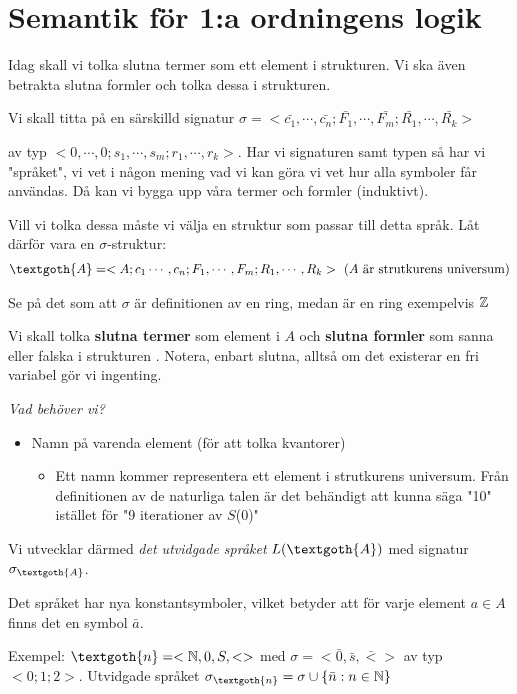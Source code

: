 \section{Semantik för 1:a ordningens logik}
\par\bigskip
\noindent Idag skall vi tolka slutna termer som ett element i strukturen. Vi ska även betrakta slutna formler och tolka dessa i strukturen.
\par\bigskip
\noindent Vi skall titta på en särskilld signatur $\sigma = <\bar{c_1},\cdots, \bar{c_n};\bar{F_1},\cdots, \bar{F_m};\bar{R_1},\cdots,\bar{R_k}>$\par\noindent av typ $<0,\cdots,0;s_1,\cdots,s_m;r_1,\cdots,r_k>$. Har vi signaturen samt typen så har vi "språket", vi vet i någon mening vad vi kan göra vi vet hur alla symboler får användas. Då kan vi bygga upp våra termer och formler (induktivt).
\par\bigskip
\noindent Vill vi tolka dessa måste vi välja en struktur som passar till detta språk. Låt därför  vara en $\sigma$-struktur:
\begin{equation*}
  \begin{gathered}
    \textgoth{A} = <A; c_1\cdots,c_n;F_1,\cdots,F_m;R_1,\cdots,R_k> \text{ ($A$ är strutkurens universum)}
  \end{gathered}
\end{equation*}\par
\noindent Se på det som att $\sigma$ är definitionen av en ring, medan  är en ring exempelvis $\mathbb{Z}$
\par\bigskip
\noindent Vi skall tolka \textbf{slutna termer }som element i $A$ och \textbf{slutna formler} som sanna eller falska i strukturen . Notera, enbart slutna, alltså om det existerar en fri variabel gör vi ingenting.
\par\bigskip
\noindent \textit{Vad behöver vi?}\par
\begin{itemize}
  \item Namn på varenda element (för att tolka kvantorer)
    \begin{itemize}
      \item Ett namn kommer representera ett element i strutkurens universum. Från definitionen av de naturliga talen är det behändigt att kunna säga "10" istället för "9 iterationer av $S$(0)"
    \end{itemize}
\end{itemize}
\par\bigskip
\noindent Vi utvecklar därmed \textit{det utvidgade språket} $L(\textgoth{A})$ med signatur $\sigma_{\textgoth{A}}$.\par
\noindent Det språket har nya konstantsymboler, vilket betyder att för varje element $a\in A$ finns det en symbol $\bar{a}$.
\par\bigskip
\noindent Exempel: $\textgoth{n} = <\N,0,S,<>$ med $\sigma = <\bar{0}, \bar{s}, \bar{<}>$ av typ $<0;1;2>$. Utvidgade språket $\sigma_{\textgoth{n}} = \sigma\cup\{\bar{n}:n\in\N\}$
\par\bigskip

